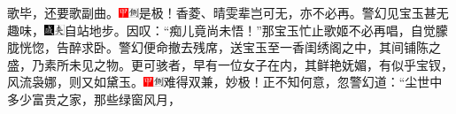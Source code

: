 歌毕，还要歌副曲。{\includegraphics[width=3mm]{../Images/00002}\includegraphics[width=3mm]{../Images/00011}\footnotesize \kaishu 是极！香菱、晴雯辈岂可无，亦不必再。}警幻见宝玉甚无趣味，{\includegraphics[width=3mm]{../Images/00005}\includegraphics[width=3mm]{../Images/00012}\footnotesize \kaishu 自站地步。}因叹：``痴儿竟尚未悟！''那宝玉忙止歌姬不必再唱，自觉朦胧恍惚，告醉求卧。警幻便命撤去残席，送宝玉至一香闺绣阁之中，其间铺陈之盛，乃素所未见之物。更可骇者，早有一位女子在内，其鲜艳妩媚，有似乎宝钗，风流袅娜，则又如黛玉。{\includegraphics[width=3mm]{../Images/00002}\includegraphics[width=3mm]{../Images/00011}\footnotesize \kaishu 难得双兼，妙极！}正不知何意，忽警幻道：``尘世中多少富贵之家，那些绿窗风月，